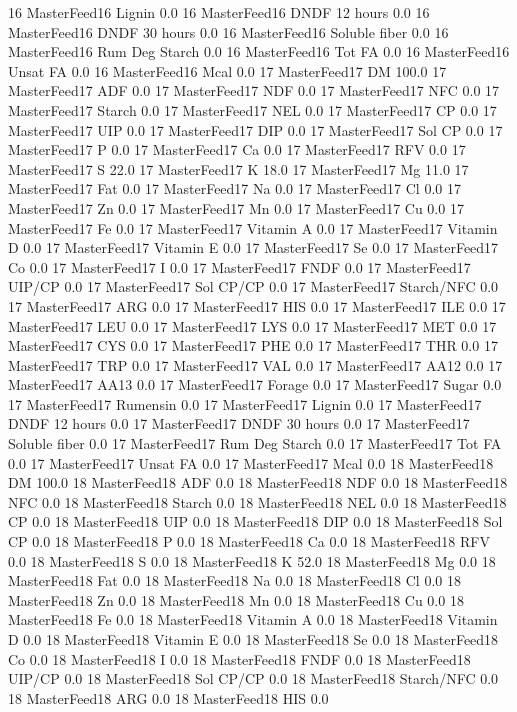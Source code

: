 \documentclass[letterpaper,10pt,english]{sphinxmanual}
\begin{document}
\begin{sphinxVerbatim}[commandchars=\\\{\},numbers=left,firstnumber=1,stepnumber=1]
16 MasterFeed16 Lignin 0.0
16 MasterFeed16 DNDF 12 hours 0.0
16 MasterFeed16 DNDF 30 hours 0.0
16 MasterFeed16 Soluble fiber 0.0
16 MasterFeed16 Rum Deg Starch 0.0
16 MasterFeed16 Tot FA 0.0
16 MasterFeed16 Unsat FA 0.0
16 MasterFeed16 Mcal 0.0
17 MasterFeed17 DM 100.0
17 MasterFeed17 ADF 0.0
17 MasterFeed17 NDF 0.0
17 MasterFeed17 NFC 0.0
17 MasterFeed17 Starch 0.0
17 MasterFeed17 NEL 0.0
17 MasterFeed17 CP 0.0
17 MasterFeed17 UIP 0.0
17 MasterFeed17 DIP 0.0
17 MasterFeed17 Sol CP 0.0
17 MasterFeed17 P 0.0
17 MasterFeed17 Ca 0.0
17 MasterFeed17 RFV 0.0
17 MasterFeed17 S 22.0
17 MasterFeed17 K 18.0
17 MasterFeed17 Mg 11.0
17 MasterFeed17 Fat 0.0
17 MasterFeed17 Na 0.0
17 MasterFeed17 Cl 0.0
17 MasterFeed17 Zn 0.0
17 MasterFeed17 Mn 0.0
17 MasterFeed17 Cu 0.0
17 MasterFeed17 Fe 0.0
17 MasterFeed17 Vitamin A 0.0
17 MasterFeed17 Vitamin D 0.0
17 MasterFeed17 Vitamin E 0.0
17 MasterFeed17 Se 0.0
17 MasterFeed17 Co 0.0
17 MasterFeed17 I 0.0
17 MasterFeed17 FNDF 0.0
17 MasterFeed17 UIP/CP 0.0
17 MasterFeed17 Sol CP/CP 0.0
17 MasterFeed17 Starch/NFC 0.0
17 MasterFeed17 ARG 0.0
17 MasterFeed17 HIS 0.0
17 MasterFeed17 ILE 0.0
17 MasterFeed17 LEU 0.0
17 MasterFeed17 LYS 0.0
17 MasterFeed17 MET 0.0
17 MasterFeed17 CYS 0.0
17 MasterFeed17 PHE 0.0
17 MasterFeed17 THR 0.0
17 MasterFeed17 TRP 0.0
17 MasterFeed17 VAL 0.0
17 MasterFeed17 AA\PYGZsh{}12 0.0
17 MasterFeed17 AA\PYGZsh{}13 0.0
17 MasterFeed17 \PYGZpc{} Forage 0.0
17 MasterFeed17 Sugar \PYGZpc{} 0.0
17 MasterFeed17 Rumensin 0.0
17 MasterFeed17 Lignin 0.0
17 MasterFeed17 DNDF 12 hours 0.0
17 MasterFeed17 DNDF 30 hours 0.0
17 MasterFeed17 Soluble fiber 0.0
17 MasterFeed17 Rum Deg Starch 0.0
17 MasterFeed17 Tot FA 0.0
17 MasterFeed17 Unsat FA 0.0
17 MasterFeed17 Mcal 0.0
18 MasterFeed18 DM 100.0
18 MasterFeed18 ADF 0.0
18 MasterFeed18 NDF 0.0
18 MasterFeed18 NFC 0.0
18 MasterFeed18 Starch 0.0
18 MasterFeed18 NEL 0.0
18 MasterFeed18 CP 0.0
18 MasterFeed18 UIP 0.0
18 MasterFeed18 DIP 0.0
18 MasterFeed18 Sol CP 0.0
18 MasterFeed18 P 0.0
18 MasterFeed18 Ca 0.0
18 MasterFeed18 RFV 0.0
18 MasterFeed18 S 0.0
18 MasterFeed18 K 52.0
18 MasterFeed18 Mg 0.0
18 MasterFeed18 Fat 0.0
18 MasterFeed18 Na 0.0
18 MasterFeed18 Cl 0.0
18 MasterFeed18 Zn 0.0
18 MasterFeed18 Mn 0.0
18 MasterFeed18 Cu 0.0
18 MasterFeed18 Fe 0.0
18 MasterFeed18 Vitamin A 0.0
18 MasterFeed18 Vitamin D 0.0
18 MasterFeed18 Vitamin E 0.0
18 MasterFeed18 Se 0.0
18 MasterFeed18 Co 0.0
18 MasterFeed18 I 0.0
18 MasterFeed18 FNDF 0.0
18 MasterFeed18 UIP/CP 0.0
18 MasterFeed18 Sol CP/CP 0.0
18 MasterFeed18 Starch/NFC 0.0
18 MasterFeed18 ARG 0.0
18 MasterFeed18 HIS 0.0

\end{sphinxVerbatim}
\end{document}
